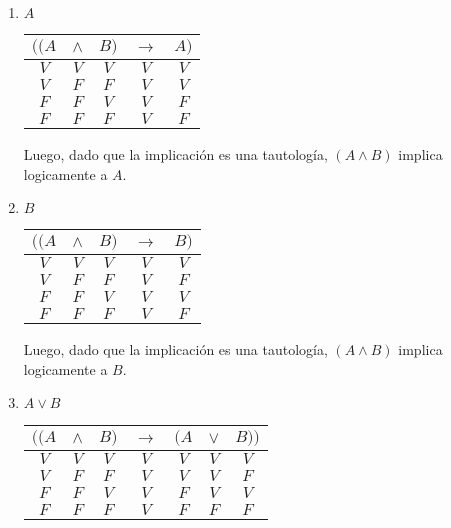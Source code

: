 \documentclass[osajnl,twocolumn,showpacs,superscriptaddress,10pt]{revtex4-1} %
\begin{document}
\begin{enumerate}[i-]
  \item $A$

  \begin{table}[h!]
    \setlength{\tabcolsep}{1.0em}
    \centering
    \begin{tabular}{ccc|c|c}
      $((A$ & $\wedge$ & $B)$ & $\rightarrow$ & $A)$ \\
      \hline
      $V$ & $V$ & $V$ & $V$ & $V$ \\
      $V$ & $F$ & $F$ & $V$ & $V$ \\
      $F$ & $F$ & $V$ & $V$ & $F$ \\
      $F$ & $F$ & $F$ & $V$ & $F$
    \end{tabular}
  \end{table}

  Luego, dado que la implicación es una tautología, $(A \wedge B)$ implica logicamente a $A$. \\

  \item $B$

  \begin{table}[h!]
    \setlength{\tabcolsep}{1.0em}
    \centering
    \begin{tabular}{ccc|c|c}
      $((A$ & $\wedge$ & $B)$ & $\rightarrow$ & $B)$ \\
      \hline
      $V$ & $V$ & $V$ & $V$ & $V$ \\
      $V$ & $F$ & $F$ & $V$ & $F$ \\
      $F$ & $F$ & $V$ & $V$ & $V$ \\
      $F$ & $F$ & $F$ & $V$ & $F$
    \end{tabular}
  \end{table}

  Luego, dado que la implicación es una tautología, $(A \wedge B)$ implica logicamente a $B$. \\

  \item $A \vee B$

  \begin{table}[h!]
    \setlength{\tabcolsep}{1.0em}
    \centering
    \begin{tabular}{ccc|c|ccc}
      $((A$ & $\wedge$ & $B)$ & $\rightarrow$ & $(A$ & $\vee$ & $B))$ \\
      \hline
      $V$ & $V$ & $V$ & $V$ & $V$ & $V$ & $V$ \\
      $V$ & $F$ & $F$ & $V$ & $V$ & $V$ & $F$ \\
      $F$ & $F$ & $V$ & $V$ & $F$ & $V$ & $V$ \\
      $F$ & $F$ & $F$ & $V$ & $F$ & $F$ & $F$
    \end{tabular}
  \end{table}


\end{enumerate}
\end{document}

